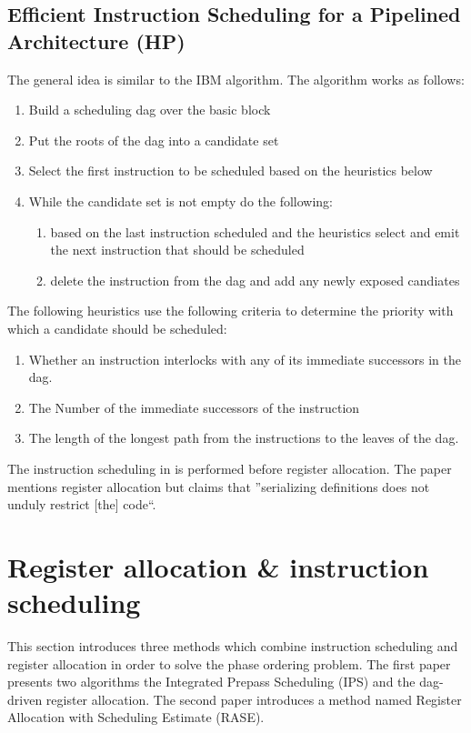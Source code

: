 \documentclass[a4paper,10pt]{article}
\begin{document}
\subsection{Efficient Instruction Scheduling for a Pipelined Architecture (HP)}
The general idea is similar to the IBM algorithm. The algorithm works as follows:
\begin{enumerate}
 \item Build a scheduling dag over the basic block
 \item Put the roots of the dag into a candidate set
 \item Select the first instruction to be scheduled based on the heuristics below
 \item While the candidate set is not empty do the following:
    \begin{enumerate}
    \item based on the last instruction scheduled and the heuristics select and emit the next instruction that should be scheduled
    \item delete the instruction from the dag and add any newly exposed candiates
    \end{enumerate}
\end{enumerate}

The following heuristics use the following criteria to determine the priority with which a candidate should be scheduled:
\begin{enumerate}
 \item Whether an instruction interlocks with any of its immediate successors in the dag.
 \item The Number of the immediate successors of the instruction
 \item The length of the longest path from the instructions to the leaves of the dag.
\end{enumerate}

The instruction scheduling in is performed before register allocation. The paper mentions register allocation but claims that 
''serializing definitions does not unduly restrict [the] code``.

\section{Register allocation \& instruction scheduling}
This section introduces three methods which combine instruction scheduling and register allocation in order to solve the phase
ordering problem. The first paper presents two algorithms the Integrated Prepass Scheduling (IPS) and the dag-driven register allocation.
The second paper introduces a method named Register Allocation with Scheduling Estimate (RASE).
\end{document}
